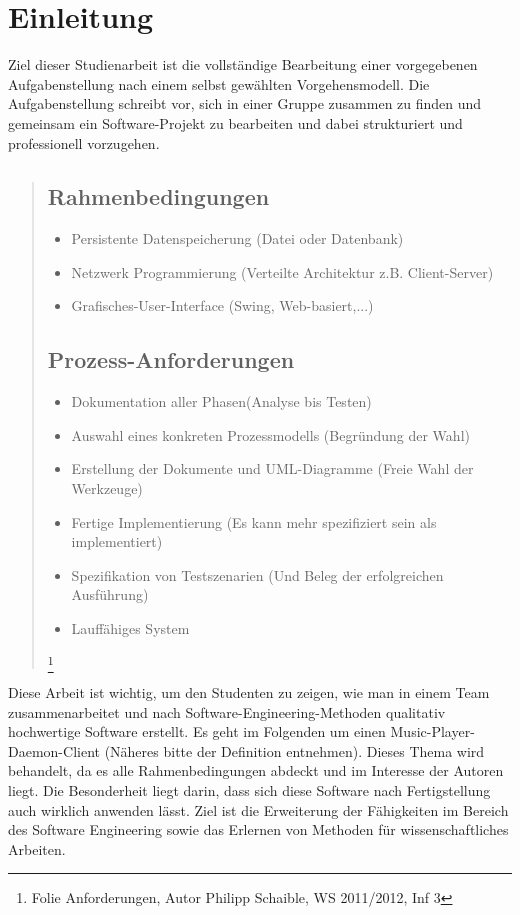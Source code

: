 \chapter{Einleitung}
Ziel dieser Studienarbeit ist die vollständige Bearbeitung einer vorgegebenen Aufgabenstellung nach einem selbst gewählten Vorgehensmodell. Die Aufgabenstellung schreibt vor, sich in einer Gruppe zusammen zu finden und gemeinsam ein Software-Projekt zu bearbeiten und dabei strukturiert und professionell vorzugehen.\\

\begin{quote}
\section{Rahmenbedingungen}

\renewcommand{\labelitemi}{•}
\begin{itemize}
	\item Persistente Datenspeicherung (Datei oder Datenbank)
	\item Netzwerk Programmierung (Verteilte Architektur z.B. Client-Server)
	\item Grafisches-User-Interface (Swing, Web-basiert,...)
\end{itemize}

\section{Prozess-Anforderungen}

\begin{itemize}
	\item Dokumentation aller Phasen(Analyse bis Testen)
	\item Auswahl eines konkreten Prozessmodells (Begründung der Wahl)
	\item Erstellung der Dokumente und UML-Diagramme (Freie Wahl der Werkzeuge)
	\item Fertige Implementierung (Es kann mehr spezifiziert sein als implementiert)
	\item Spezifikation von Testszenarien (Und Beleg der erfolgreichen Ausführung)
	\item Lauffähiges System 
\end{itemize}

\footnote{Folie Anforderungen, Autor Philipp Schaible, WS 2011/2012, Inf 3}
\end{quote}

Diese Arbeit ist wichtig, um den Studenten zu zeigen, wie man in einem Team zusammenarbeitet und nach Software-Engineering-Methoden qualitativ hochwertige Software erstellt.
Es geht im Folgenden um einen Music-Player-Daemon-Client (Näheres bitte der Definition entnehmen). Dieses Thema wird behandelt, da es alle Rahmenbedingungen abdeckt und im Interesse der Autoren liegt. Die Besonderheit liegt darin, dass sich diese Software nach Fertigstellung auch wirklich anwenden lässt. Ziel ist die Erweiterung der Fähigkeiten im Bereich des Software Engineering sowie das Erlernen von Methoden für wissenschaftliches Arbeiten.
